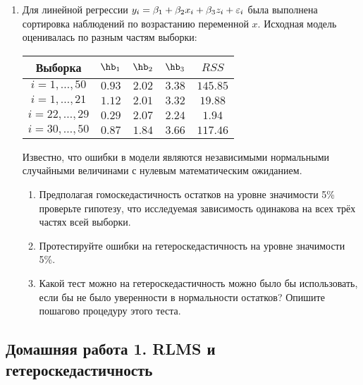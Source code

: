 \documentclass[12pt, a4paper]{article}
\theoremstyle{definition}
\begin{document}
\begin{enumerate}
\item Для линейной регрессии $y_i = \beta_1 + \beta_2 x_i + \beta_3 z_i + \varepsilon_i$ была выполнена сортировка наблюдений по возрастанию переменной $x$. Исходная модель оценивалась по разным частям выборки:

\begin{tabular}{c|cccc}
Выборка & $\hb_1$ & $\hb_2$ & $\hb_3$ & $RSS$ \\

\hline
$i=1,\ldots, 50$ & $0.93$ & $2.02$ & $3.38$ & $145.85$ \\
$i=1,\ldots, 21$ & $1.12$ & $2.01$ & $3.32$ & $19.88$ \\
$i=22,\ldots, 29$ & $0.29$ & $2.07$ & $2.24$ & $1.94$ \\
$i=30,\ldots, 50$ & $0.87$ & $1.84$ & $3.66$ & $117.46$ \\
\end{tabular}

Известно, что ошибки в модели являются независимыми нормальными случайными величинами с нулевым математическим ожиданием.

\begin{enumerate}
\item Предполагая гомоскедастичность остатков на уровне значимости 5\% проверьте гипотезу, что исследуемая зависимость одинакова на всех трёх частях всей выборки.
\item Протестируйте ошибки на гетероскедастичность на уровне значимости 5\%.
\item Какой тест можно на гетероскедастичность можно было бы использовать, если бы не было уверенности в нормальности остатков? Опишите пошагово процедуру этого теста.
\end{enumerate}

\end{enumerate}


\subsection{Домашняя работа 1. RLMS и гетероскедастичность}
\end{document}
